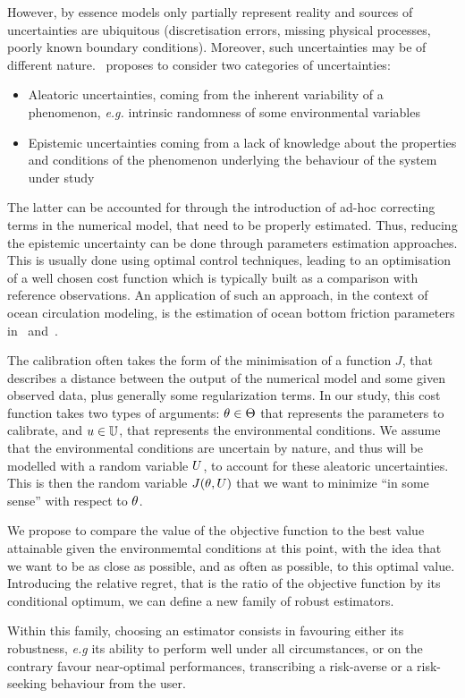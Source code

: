 \documentclass[../../Main_ManuscritThese.tex]{subfiles}
\begin{document}
However, by essence models
only partially represent reality and sources of uncertainties are
ubiquitous (discretisation errors, missing physical processes, poorly
known boundary conditions). Moreover, such uncertainties may be of
different nature.~\cite{walker_defining_2003} proposes to consider two
categories of uncertainties:
\begin{itemize}
\item Aleatoric uncertainties, coming from the inherent variability of
a phenomenon, \emph{e.g.} intrinsic randomness of some environmental
variables
\item Epistemic uncertainties coming from a lack of knowledge about
the properties and conditions of the phenomenon underlying the
behaviour of the system under study
\end{itemize} The latter can be accounted for through the introduction
of ad-hoc correcting terms in the numerical model, that need to be
properly estimated. Thus, reducing the epistemic uncertainty can be
done through parameters estimation approaches. This is usually done
using optimal control techniques, leading to an optimisation of a well
chosen cost function which is typically built as a comparison with
reference observations.
  An application of such an approach, in the context of ocean
circulation modeling, is the estimation of ocean bottom friction
parameters in~\cite{das_estimation_1991}
and~\cite{boutet_estimation_2015}.

 
  
  The calibration often takes the form of the minimisation of a
function $J$, that describes a distance between the output of the
numerical model and some given observed data, plus generally some
regularization terms.  In our study, this cost function takes two
types of arguments: $\theta\in\Theta$ that represents the parameters to
calibrate, and $u\in\mathbb{U}$, that represents the environmental
conditions.  We assume that the environmental conditions are uncertain
by nature, and thus will be modelled with a random variable $U$, to
account for these aleatoric uncertainties.  This is then the random
variable $J(\theta,U)$ that we want to minimize ``in some sense'' with
respect to $\theta$.



  
  We propose to compare the value of the objective function to the
best value attainable given the environmemtal conditions at this
point, with the idea that we want to be as close as possible, and as
often as possible, to this optimal value. Introducing the relative
regret, that is the ratio of the objective function by its conditional
optimum, we can define a new family of robust estimators.

  Within this family, choosing an estimator consists in favouring
either its robustness, \emph{e.g} its ability to perform well under
all circumstances, or on the contrary favour near-optimal
performances, transcribing a risk-averse or a risk-seeking behaviour
from the user.
 

\clearpage
\subfileLocal{
	\pagestyle{empty}
	
	
}
\end{document}
